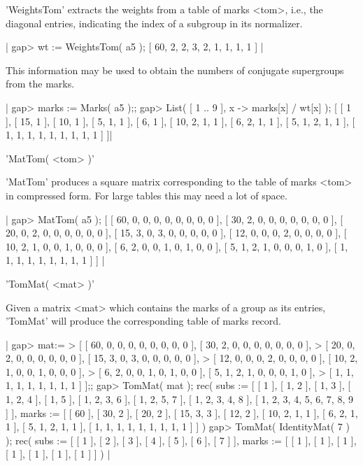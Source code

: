 'WeightsTom' extracts the weights from a table of  marks <tom>, i.e., the
diagonal entries, indicating the index of a subgroup in its normalizer.

|    gap> wt := WeightsTom( a5 ); 
    [ 60, 2, 2, 3, 2, 1, 1, 1, 1 ] |

This  information  may  be  used  to  obtain  the  numbers  of  conjugate
supergroups from the marks.

|    gap> marks := Marks( a5 );; 
    gap> List( [ 1 .. 9 ], x -> marks[x] / wt[x] );
    [ [ 1 ], [ 15, 1 ], [ 10, 1 ], [ 5, 1, 1 ], [ 6, 1 ], [ 10, 2, 1, 1 ],
      [ 6, 2, 1, 1 ], [ 5, 1, 2, 1, 1 ], [ 1, 1, 1, 1, 1, 1, 1, 1, 1 ] ]|


'MatTom( <tom> )'

'MatTom'  produces a square matrix corresponding  to the  table  of marks
<tom> in compressed form.  For large tables this may need a lot of space.

|    gap> MatTom( a5 );
    [ [ 60, 0, 0, 0, 0, 0, 0, 0, 0 ], [ 30, 2, 0, 0, 0, 0, 0, 0, 0 ], 
      [ 20, 0, 2, 0, 0, 0, 0, 0, 0 ], [ 15, 3, 0, 3, 0, 0, 0, 0, 0 ], 
      [ 12, 0, 0, 0, 2, 0, 0, 0, 0 ], [ 10, 2, 1, 0, 0, 1, 0, 0, 0 ], 
      [ 6, 2, 0, 0, 1, 0, 1, 0, 0 ], [ 5, 1, 2, 1, 0, 0, 0, 1, 0 ], 
      [ 1, 1, 1, 1, 1, 1, 1, 1, 1 ] ] |


'TomMat( <mat> )'

Given a matrix <mat> which contains the marks of a group as  its entries,
'TomMat' will produce the corresponding table of marks record.

|    gap> mat:= 
    > [ [ 60, 0, 0, 0, 0, 0, 0, 0, 0 ], [ 30, 2, 0, 0, 0, 0, 0, 0, 0 ], 
    >   [ 20, 0, 2, 0, 0, 0, 0, 0, 0 ], [ 15, 3, 0, 3, 0, 0, 0, 0, 0 ], 
    >   [ 12, 0, 0, 0, 2, 0, 0, 0, 0 ], [ 10, 2, 1, 0, 0, 1, 0, 0, 0 ], 
    >   [ 6, 2, 0, 0, 1, 0, 1, 0, 0 ], [ 5, 1, 2, 1, 0, 0, 0, 1, 0 ], 
    >   [ 1, 1, 1, 1, 1, 1, 1, 1, 1 ] ];;
    gap> TomMat( mat );
    rec(
      subs := [ [ 1 ], [ 1, 2 ], [ 1, 3 ], [ 1, 2, 4 ], [ 1, 5 ], 
          [ 1, 2, 3, 6 ], [ 1, 2, 5, 7 ], [ 1, 2, 3, 4, 8 ], 
          [ 1, 2, 3, 4, 5, 6, 7, 8, 9 ] ],
      marks := [ [ 60 ], [ 30, 2 ], [ 20, 2 ], [ 15, 3, 3 ], [ 12, 2 ], 
          [ 10, 2, 1, 1 ], [ 6, 2, 1, 1 ], [ 5, 1, 2, 1, 1 ], 
          [ 1, 1, 1, 1, 1, 1, 1, 1, 1 ] ] )
    gap> TomMat( IdentityMat( 7 ) );
    rec(
      subs := [ [ 1 ], [ 2 ], [ 3 ], [ 4 ], [ 5 ], [ 6 ], [ 7 ] ],
      marks := [ [ 1 ], [ 1 ], [ 1 ], [ 1 ], [ 1 ], [ 1 ], [ 1 ] ] ) |

